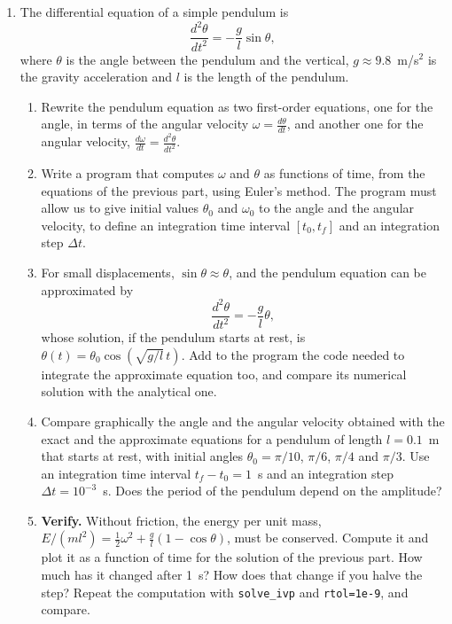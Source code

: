 \begin{enumerate}
\item \label{ej:pendulo-en} The differential equation of a simple pendulum is
\begin{equation*}
\frac{d^2\theta}{dt^2} =-\frac{g}{l}\sin\theta,
\end{equation*}
where $\theta$ is the angle between the pendulum and the vertical, $g \approx 9.8$~m/s$^2$ is the gravity acceleration and $l$ is the length of the pendulum.
\begin{enumerate}
\item Rewrite the pendulum equation as two first-order equations, one for the angle, in terms of the angular velocity $\omega = \frac{d\theta}{dt}$, and another one for the angular velocity, $\frac{d\omega}{dt} = \frac{d^2\theta}{dt^2}$.
\item Write a program that computes $\omega$ and $\theta$ as functions of time, from the equations of the previous part, using Euler's method. The program must allow us to give initial values $\theta_0$ and $\omega_0$ to the angle and the angular velocity, to define an integration time interval $[t_0,t_f]$ and an integration step $\Delta t$.
\item For small displacements, $\sin\theta \approx \theta$, and the pendulum equation can be approximated by
\begin{equation*}
\frac{d^2\theta}{dt^2} =-\frac{g}{l}\theta,
\end{equation*}
whose solution, if the pendulum starts at rest, is $\theta(t)=\theta_0\cos(\sqrt{g/l}\,t)$. Add to the program the code needed to integrate the approximate equation too, and compare its numerical solution with the analytical one.
\item Compare graphically the angle and the angular velocity obtained with the exact and the approximate equations for a pendulum of length $l = 0.1$~m that starts at rest, with initial angles $\theta_0=\pi/10$, $\pi/6$, $\pi/4$ and $\pi/3$. Use an integration time interval $t_f-t_0 =1$~s and an integration step $\Delta t = 10^{-3}$~s. Does the period of the pendulum depend on the amplitude?
\item \textbf{Verify.} Without friction, the energy per unit mass, $E/(ml^2)=\frac{1}{2}\omega^2+\frac{g}{l}(1-\cos\theta)$, must be conserved. Compute it and plot it as a function of time for the solution of the previous part. How much has it changed after 1~s? How does that change if you halve the step? Repeat the computation with \texttt{solve\_ivp} and \texttt{rtol=1e-9}, and compare.
\end{enumerate}


\end{enumerate}
